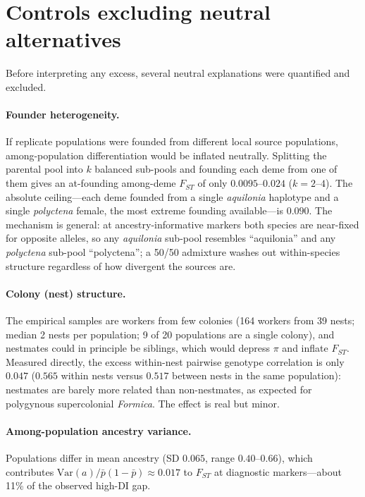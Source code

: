 \documentclass[11pt,a4paper]{article}
\begin{document}
\section{Controls excluding neutral alternatives}

Before interpreting any excess, several neutral explanations were quantified and
excluded.

\paragraph{Founder heterogeneity.}
If replicate populations were founded from different local source populations,
among-population differentiation would be inflated neutrally. Splitting the
parental pool into $k$ balanced sub-pools and founding each deme from one of
them gives an at-founding among-deme $F_{ST}$ of only $0.0095$--$0.024$
($k=2$--$4$). The absolute ceiling---each deme founded from a single
\textit{aquilonia} haplotype and a single \textit{polyctena} female, the most
extreme founding available---is $0.090$. The mechanism is general: at
ancestry-informative markers both species are near-fixed for opposite alleles,
so any \textit{aquilonia} sub-pool resembles ``aquilonia'' and any
\textit{polyctena} sub-pool ``polyctena''; a 50/50 admixture washes out
within-species structure regardless of how divergent the sources are.

\paragraph{Colony (nest) structure.}
The empirical samples are workers from few colonies (164 workers from 39 nests;
median 2 nests per population; 9 of 20 populations are a single colony), and
nestmates could in principle be siblings, which would depress $\pi$ and inflate
$F_{ST}$. Measured directly, the excess within-nest pairwise genotype
correlation is only $0.047$ ($0.565$ within nests versus $0.517$ between nests in
the same population): nestmates are barely more related than non-nestmates,
as expected for polygynous supercolonial \textit{Formica}. The effect is real but
minor.

\paragraph{Among-population ancestry variance.}
Populations differ in mean ancestry (SD $0.065$, range $0.40$--$0.66$), which
contributes $\mathrm{Var}(a)/\bar{p}(1-\bar{p})\approx0.017$ to $F_{ST}$ at
diagnostic markers---about 11\% of the observed high-DI gap.
\end{document}
